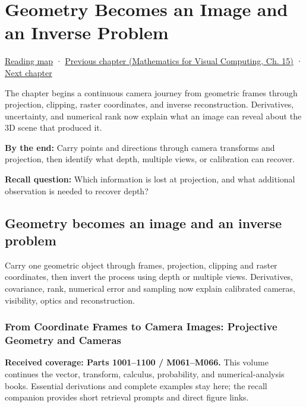 \chapter{Geometry Becomes an Image and an Inverse Problem}\label{02-foundations-ii-ch032-geometry-becomes-an-image-and-an-inverse-problem}\hypertarget{02-foundations-ii-ch032}{}\label{stagechapter:02-foundations-ii-ch032}

\hyperref[volume-reading-map]{Reading map} · \href{../02-Mathematics-for-Visual-Computing/main.pdf\#nameddest=02-foundations-ii-ch031-implement-probability-with-numerical-contracts}{Previous chapter (Mathematics for Visual Computing, Ch. 15)} · \hyperref[02-foundations-ii-ch033-projection-clipping-and-raster-sampling]{Next chapter}

The chapter begins a continuous camera journey from geometric frames through projection, clipping, raster coordinates, and inverse reconstruction. Derivatives, uncertainty, and numerical rank now explain what an image can reveal about the 3D scene that produced it.

\textbf{By the end:} Carry points and directions through camera transforms and projection, then identify what depth, multiple views, or calibration can recover.

\textbf{Recall question:} Which information is lost at projection, and what additional observation is needed to recover depth?

\section{Geometry becomes an image and an inverse problem}\label{02-foundations-ii-ch032-geometry-becomes-an-image-and-an-inverse-problem-1}

Carry one geometric object through frames, projection, clipping and raster coordinates, then invert the process using depth or multiple views. Derivatives, covariance, rank, numerical error and sampling now explain calibrated cameras, visibility, optics and reconstruction.

\subsection{From Coordinate Frames to Camera Images: Projective Geometry and Cameras}\label{02-foundations-ii-ch032-from-coordinate-frames-to-camera-images-projective-geometry-and-cameras}

\textbf{Received coverage: Parts 1001--1100 / M061--M066.} This volume continues the vector, transform, calculus, probability, and numerical-analysis books. Essential derivations and complete examples stay here; the recall companion provides short retrieval prompts and direct figure links.

